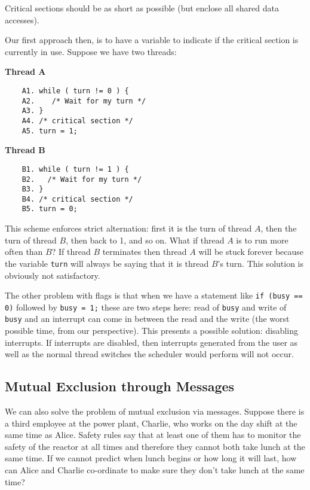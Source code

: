 Critical sections should be as short as possible (but enclose all shared data accesses).

Our first approach then, is to have a variable to indicate if the critical section is currently in use. Suppose we have two threads:

\begin{multicols}{2}
\textbf{Thread A}
	\begin{verbatim}
	A1. while ( turn != 0 ) {
	A2.    /* Wait for my turn */
	A3. }
	A4. /* critical section */
	A5. turn = 1;
	\end{verbatim}
\columnbreak
\textbf{Thread B}
	\begin{verbatim}
	B1. while ( turn != 1 ) {
	B2.   /* Wait for my turn */
	B3. }
	B4. /* critical section */
	B5. turn = 0;
	\end{verbatim}
\end{multicols}

This scheme enforces strict alternation: first it is the turn of thread $A$, then the turn of thread $B$, then back to 1, and so on. What if thread $A$ is to run more often than $B$? If thread $B$ terminates then thread $A$ will be stuck forever because the variable \texttt{turn} will always be saying that it is thread $B$'s turn. This solution is obviously not satisfactory. 

The other problem with flags is that when we have a statement like \texttt{if (busy == 0)} followed by \texttt{busy = 1;} these are two steps here: read of \texttt{busy} and write of \texttt{busy} and an interrupt can come in between the read and the write (the worst possible time, from our perspective). This presents a possible solution: disabling interrupts. If interrupts are disabled, then interrupts generated from the user as well as the normal thread switches the scheduler would perform will not occur.

\subsection*{Mutual Exclusion through Messages}

We can also solve the problem of mutual exclusion via messages. Suppose there is a third employee at the power plant, Charlie, who works on the day shift at the same time as Alice. Safety rules say that at least one of them has to monitor the safety of the reactor at all times and therefore they cannot both take lunch at the same time. If we cannot predict when lunch begins or how long it will last, how can Alice and Charlie co-ordinate to make sure they don't take lunch at the same time?





